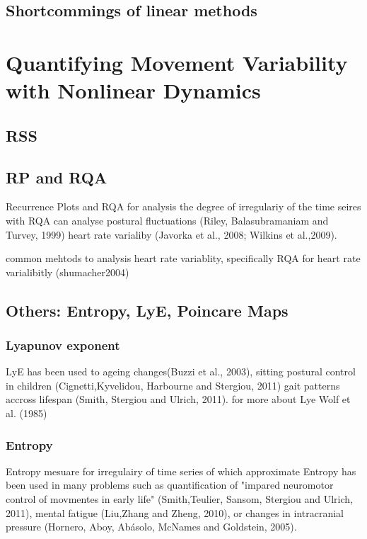 \subsection{Shortcommings of linear methods}
%



\section{Quantifying Movement Variability with Nonlinear Dynamics}
\subsection{RSS}
\subsection{RP and RQA}

Recurrence Plots and RQA for analysis the degree of irregulariy of the time seires
with RQA can analyse
postural fluctuations (Riley, Balasubramaniam and Turvey, 1999)
heart rate varialiby (Javorka et al., 2008; Wilkins et al.,2009).

common mehtods to analysis heart rate variablity,
specifically RQA for heart rate varialibitly (shumacher2004)


\subsection{Others: Entropy, LyE, Poincare Maps}


\subsubsection{Lyapunov exponent}
LyE has been used to 
ageing changes(Buzzi et al., 2003),
sitting postural control in children (Cignetti,Kyvelidou, Harbourne and Stergiou, 2011)
gait patterns accross lifespan (Smith, Stergiou and Ulrich, 2011).
for more about Lye Wolf et al. (1985)


\subsubsection{Entropy}
Entropy mesuare for irregulairy of time series
of which approximate Entropy has been used in many problems such as
quantification of "impared neuromotor control of movmentes in early life"
(Smith,Teulier, Sansom, Stergiou and Ulrich, 2011),
mental fatigue  (Liu,Zhang and Zheng, 2010),
or changes in intracranial pressure 
(Hornero, Aboy, Abásolo, McNames and Goldstein, 2005).

